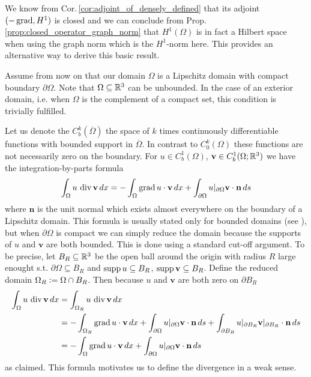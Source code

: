 \documentclass[../master_thesis.tex]{subfiles}
\begin{document}
We know from Cor.\,\ref{cor:adjoint_of_densely_defined} 
that its adjoint $(-\operatorname{grad}, H^1)$ is closed and 
we can conclude from Prop.\,\ref{prop:closed_operator_graph_norm} 
that $H^1(\Omega)$ is in fact a Hilbert space 
when using the graph norm which is the $H^1$-norm here. This provides an alternative 
way to derive this basic result.

Assume from now on that our domain $\Omega$ is a Lipschitz domain 
with compact boundary $\partial \Omega$. Note that $\Omega \subseteq \mathbb{R}^3$ 
can be unbounded. In the case of an exterior domain, i.e. when $\Omega$ is 
the complement of a compact set, this condition is trivially fulfilled.

Let us denote the $C^k_b(\overline{\Omega})$ the space of $k$ times continuously
differentiable functions with bounded support in $\overline{\Omega}$. 
In contrast to $C^k_0(\Omega)$ these functions are not necessarily zero on the 
boundary.
For $u \in C_b^1(\Omega)$, $\mathbf{v} \in C_b^1(\Omega;\mathbb{R}^3)$ we 
have the integration-by-parts formula
\begin{align}
    \int_\Omega u \, \operatorname{div} \mathbf{v} \, dx
    = - \int_\Omega \operatorname{grad} u \cdot \mathbf{v} \, dx
        + \int_{\partial \Omega} u|_{\partial \Omega} \mathbf{v}\cdot\mathbf{n} \, ds
        \label{eq:integration_by_parts_C1}
\end{align}
where $\mathbf{n}$ is the unit normal which exists almost everywhere on the boundary of a 
Lipschitz domain. This formula is usually stated only for 
bounded domains (see \cite[Cor.\,3.20]{monk}), but when $\partial \Omega$ is compact 
we can simply reduce the domain 
because the supports of $u$ and $\mathbf{v}$ are both bounded. This is done using 
a standard cut-off argument.
To be precise, let $B_R \subseteq \mathbb{R}^3$ be the open ball around the origin 
with radius $R$ large enought s.t. $\partial \Omega \subseteq B_R$ and 
$\operatorname{supp} u \subseteq B_R$, $\operatorname{supp} \mathbf{v} \subseteq B_R$.
Define the reduced domain $\Omega_R \vcentcolon= \Omega \cap B_R$. 
Then because $u$ and $\mathbf{v}$ are both zero on $\partial B_R$
\begin{align*}
    \int_\Omega u \, \operatorname{div} \mathbf{v} \, dx
    &= \int_{\Omega_R} u \, \operatorname{div} \mathbf{v} \, dx
    \\ &= - \int_{\Omega_R} \operatorname{grad} u \cdot \mathbf{v} \, dx
        + \int_{\partial \Omega} u|_{\partial \Omega} \mathbf{v}\cdot\mathbf{n} \, ds
        + \int_{\partial B_R} u|_{\partial B_R} \mathbf{v}|_{\partial B_R} \cdot\mathbf{n} \, ds
    \\ &= - \int_\Omega \operatorname{grad} u \cdot \mathbf{v} \, dx
        + \int_{\partial \Omega} u|_{\partial \Omega} \mathbf{v}\cdot\mathbf{n} \, ds
\end{align*}
as claimed. This formula motivates us to define the divergence in a
weak sense.
\end{document}
